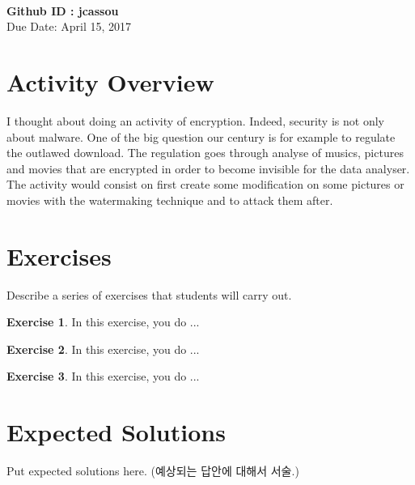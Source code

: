 \documentclass[a4paper, 11pt]{article}
\theoremstyle{definition}
\newtheorem{exercise}{Exercise}
\begin{document}
 \\
         {\phantom{} \hfill \textbf{Github ID : jcassou}} \\
         {\phantom{} \hfill Due Date: April 15, 2017} \\

\section{Activity Overview}

I thought about doing an activity of encryption. Indeed, security is not only about malware. One of the big question our century is for example to regulate the outlawed download. The regulation goes through analyse of musics, pictures and movies that are encrypted in order to become invisible for the data analyser. \\
The activity would consist on first create some modification on some pictures or movies with the watermaking technique and to attack them after.  

\section{Exercises}

Describe a series of exercises that students will carry out. 

\begin{exercise}

  In this exercise, you do ...

\end{exercise}

\begin{exercise}

  In this exercise, you do ...

\end{exercise}

\begin{exercise}

  In this exercise, you do ...

\end{exercise}

\section{Expected Solutions}

Put expected solutions here.
(예상되는 답안에 대해서 서술.)



\end{document}
